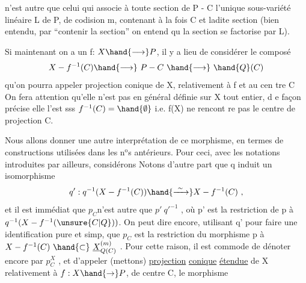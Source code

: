 
n'est autre que celui qui associe à toute section de  P - C  l'unique
sous-variété linéaire  L de P, de codision m, contenant à la fois C
et ladite section  (bien entendu, par ``contenir la section'' on entend qu
la section se factorise par L).

Si maintenant on a un f: $X \hand{\longrightarrow} P$,  il y a lieu de considérer le
composé
\[ X - f^{-1}(C) \hand{\longrightarrow}\ P - C \ \hand{\longrightarrow}\ \hand{Q}(C) \]
qu'on pourra appeler projection conique de X, relativement à f et au cen%
tre C\hand{,}  On fera attention qu'elle n'est pas en général définie sur X tout
entier, d e façon précise elle l'est sss $f^{-1}(C)=\hand{\emptyset}$ i.e. f(X) ne rencont re
pas le centre de projection C. \hand{\unsure{/|)}}

Nous allons donner une autre interprétation de ce morphisme, en
termes de constructions utilisées dans les n$^{\text{o}}$s antérieurs.  Pour ceci,
avec les notations introduites par ailleurs, considérons
\diagram{\[
\begin{array}{ccc}
X & \overset{q}{\hand{\longleftarrow}} & \underline{X}^{(m)}_{\unsure{Q|G}(C)} = \underline{X}^{(m)}x_{\mathrm{Grass}^{m}}\hand{Q}(C) \\
 & & p\var{\xout{\unsure{z}}}{}{typewriter strike-out}{ega25_25_085-v0004}\quad\hand{\downarrow} \\
 & & \hand{Q}(C) \quad .
\end{array}
\]}
Notons d'autre part que  q  induit un  isomorphisme
\[ q':q^{-1}(X-f^{-1}(C)) \hand{\xrightarrow{\ \sim\ }} X - f^{-1}(C) \ , \]
et il est immédiat que  $p_{C}$n'est autre  que   $p'\ q'^{-1}$ , où p' est la
restriction de  p à  $q^{-1}(X-f^{-1}(\unsure{C|Q}))$.  On peut dire encore, utilisant q'
pour faire une identification pure et simp, que  $p_{C}$ est la restriction
du morphisme p  à  $X - f^{-1}(C) \ \hand{\subset}\ \underline{X}^{(m)}_{Q(C)}$ . Pour cette raison, il est
commode de dénoter encore par  $p^{X}_{C}$ , et d'appeler  (mettons)  \uline{projection}
\uline{conique}  \uline{étendue}  de X\hand{,} relativement à $f:X\hand{\rightarrow} P$, de centre C, le morphisme

